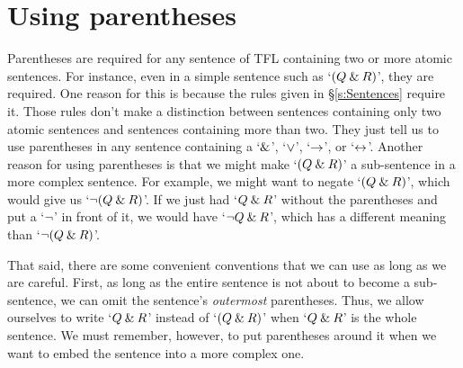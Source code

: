 


\section{Using parentheses}
\label{TFLconventions}

Parentheses are required for any sentence of TFL containing two or more atomic sentences. For instance, even in a simple sentence such as `$(Q \mathbin{\&} R)$', they are required. One reason for this is because the rules given in \S\ref{s:Sentences} require it. Those rules don't make a distinction between sentences containing only two atomic sentences and sentences containing more than two. They just tell us to use parentheses in any sentence containing a `$\mathbin{\&}$', `$\vee$', `$\rightarrow$', or `$\leftrightarrow$'. Another reason for using parentheses is that we might make `$(Q \mathbin{\&} R)$' a sub-sentence in a more complex sentence. For example, we might want to negate `$(Q \mathbin{\&} R)$', which would give us `${\neg}(Q \mathbin{\&} R)$'. If we just had `$Q \mathbin{\&} R$' without the parentheses and put a `${\neg}$' in front of it, we would have `${\neg} Q \mathbin{\&} R$', which has a different meaning than `${\neg}(Q\mathbin{\&} R)$'. 

That said, there are some convenient conventions that we can use as long as we are careful. First, as long as the entire sentence is not about to become a sub-sentence,  we can omit the sentence's \emph{outermost} parentheses. Thus, we allow ourselves to write `$Q \mathbin{\&} R$' instead of `$(Q \mathbin{\&} R)$' when `$Q \mathbin{\&} R$' is the whole sentence. We must remember, however, to put parentheses around it when we want to embed the sentence into a more complex one.

